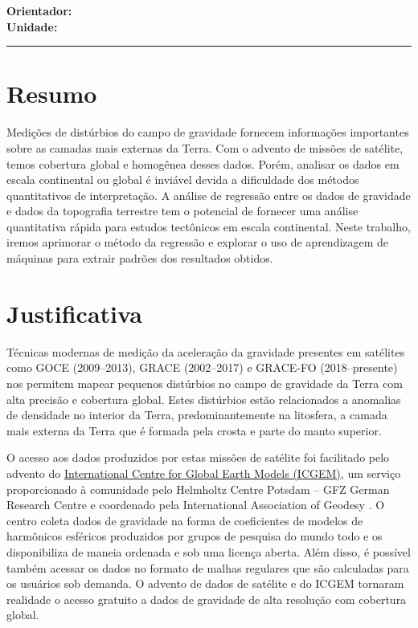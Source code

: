 \documentclass[onecolumn,a4paper,11pt]{article}
\begin{document}
\begin{FlushLeft}
  \begin{spacing}{2}
    {\Huge \textbf{\Title}}
  \end{spacing}
  \vspace{0.1cm}
  \textbf{Orientador:} \PIname
  \\[0.1cm]
  \textbf{Unidade:} \Institution
\end{FlushLeft}

{\color{mediumblue}\hrule height 1pt}

\section*{Resumo}

Medições de distúrbios do campo de gravidade fornecem informações importantes
sobre as camadas mais externas da Terra. Com o advento de missões de satélite,
temos cobertura global e homogênea desses dados. Porém, analisar os dados em
escala continental ou global é inviável devida a dificuldade dos métodos
quantitativos de interpretação. A análise de regressão entre os dados de
gravidade e dados da topografia terrestre tem o potencial de fornecer uma
análise quantitativa rápida para estudos tectônicos em escala continental.
Neste trabalho, iremos aprimorar o método da regressão e explorar o uso de
aprendizagem de máquinas para extrair padrões dos resultados obtidos.


\section{Justificativa}

Técnicas modernas de medição da aceleração da gravidade presentes em satélites como GOCE (2009--2013), GRACE (2002--2017) e GRACE-FO (2018--presente) nos permitem mapear pequenos distúrbios no campo de gravidade da Terra com alta precisão e cobertura global.
Estes distúrbios estão relacionados a anomalias de densidade no interior da Terra, predominantemente na litosfera, a camada mais externa da Terra que é formada pela crosta e parte do manto superior.

O acesso aos dados produzidos por estas missões de satélite foi facilitado pelo advento do \href{https://icgem.gfz-potsdam.de/home}{International Centre for Global Earth Models (ICGEM)}, um serviço proporcionado à comunidade pelo Helmholtz Centre Potsdam -- GFZ German Research Centre e coordenado pela International Association of Geodesy \citep{Ince2019}. O centro coleta dados de gravidade na forma de coeficientes de modelos de harmônicos esféricos produzidos por grupos de pesquisa do mundo todo e os disponibiliza de maneia ordenada e sob uma licença aberta. Além disso, é possível também acessar os dados no formato de malhas regulares que são calculadas para os usuários sob demanda. O advento de dados de satélite e do ICGEM tornaram realidade o acesso gratuito a dados de gravidade de alta resolução com cobertura global.
\end{document}
